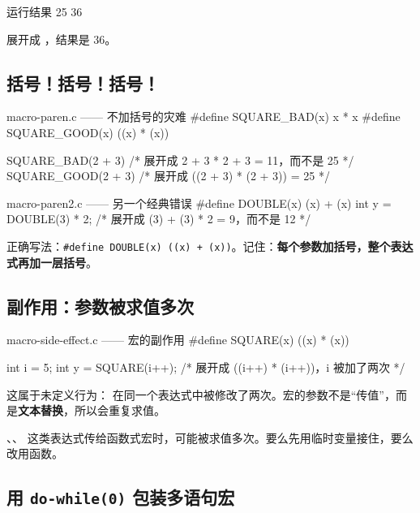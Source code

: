 \begin{outbox}{运行结果}
25
36
\end{outbox}

 展开成 ，结果是 36。

\subsection{括号！括号！括号！}

\begin{codebox}{macro-paren.c —— 不加括号的灾难}
#define SQUARE_BAD(x) x * x
#define SQUARE_GOOD(x) ((x) * (x))

SQUARE_BAD(2 + 3)    /* 展开成 2 + 3 * 2 + 3 = 11，而不是 25 */
SQUARE_GOOD(2 + 3)   /* 展开成 ((2 + 3) * (2 + 3)) = 25 */
\end{codebox}

\begin{pitfall}[宏的参数和整体都要加括号]
\begin{codebox}{macro-paren2.c —— 另一个经典错误}
#define DOUBLE(x) (x) + (x)
int y = DOUBLE(3) * 2;   /* 展开成 (3) + (3) * 2 = 9，而不是 12 */
\end{codebox}
正确写法：\texttt{\#define DOUBLE(x) ((x) + (x))}。记住：\textbf{每个参数加括号，整个表达式再加一层括号}。
\end{pitfall}

\subsection{副作用：参数被求值多次}

\begin{codebox}{macro-side-effect.c —— 宏的副作用}
#define SQUARE(x) ((x) * (x))

int i = 5;
int y = SQUARE(i++);    /* 展开成 ((i++) * (i++))，i 被加了两次 */
\end{codebox}

这属于未定义行为： 在同一个表达式中被修改了两次。宏的参数不是“传值”，而是\textbf{文本替换}，所以会重复求值。

\begin{pitfall}[带副作用的参数不要传给宏]
、、 这类表达式传给函数式宏时，可能被求值多次。要么先用临时变量接住，要么改用函数。
\end{pitfall}

\subsection{用 \texttt{do-while(0)} 包装多语句宏}

